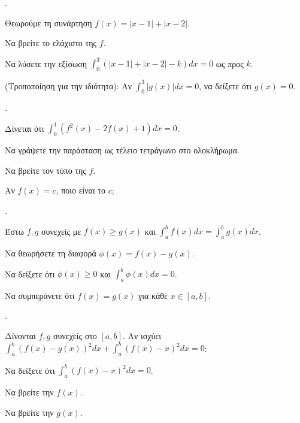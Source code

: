 \documentclass[11pt,a4paper,twocolumn]{article}
\newcounter{askhsh}
\newcommand{\askhsh}{\large\theaskhsh.\ \addtocounter{askhsh}{1}}
\begin{document}
\askhsh Θεωρούμε τη συνάρτηση $f(x) = |x-1| + |x-2|$.
\begin{alist}
\item Να βρείτε το ελάχιστο της $f$.
\item Να λύσετε την εξίσωση $\int_0^3 (|x-1| + |x-2| - k) dx = 0$ ως προς $k$. 
\item (Τροποποίηση για την ιδιότητα): Αν $\int_0^3 |g(x)| dx = 0$, να δείξετε ότι $g(x)=0$.
\end{alist}

\askhsh Δίνεται ότι $\int_0^1 (f^2(x) - 2f(x) + 1) dx = 0$.
\begin{alist}
\item Να γράψετε την παράσταση ως τέλειο τετράγωνο στο ολοκλήρωμα.
\item Να βρείτε τον τύπο της $f$.
\item Αν $f(x) = c$, ποιο είναι το $c$;
\end{alist}

\askhsh Έστω $f, g$ συνεχείς με $f(x) \ge g(x)$ και $\int_a^b f(x) dx = \int_a^b g(x) dx$.
\begin{alist}
\item Να θεωρήσετε τη διαφορά $\phi(x) = f(x) - g(x)$.
\item Να δείξετε ότι $\phi(x) \ge 0$ και $\int_a^b \phi(x) dx = 0$.
\item Να συμπεράνετε ότι $f(x) = g(x)$ για κάθε $x \in [a, b]$.
\end{alist}

\askhsh Δίνονται $f, g$ συνεχείς στο $[a,b]$. Αν ισχύει $\int_a^b (f(x) - g(x))^2 dx + \int_a^b (f(x) - x)^2 dx = 0$:
\begin{alist}
\item Να δείξετε ότι $\int_a^b (f(x)-x)^2 dx = 0$.
\item Να βρείτε την $f(x)$.
\item Να βρείτε την $g(x)$.
\end{alist}
\end{document}
